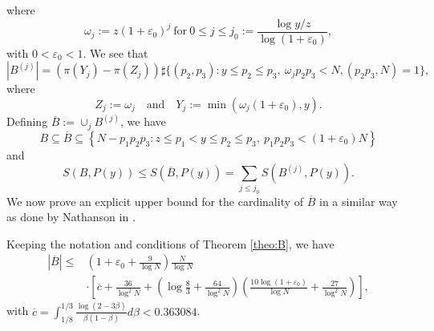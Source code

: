 \documentclass[12pt]{amsart}
\begin{document}
where
\begin{equation}\label{j0eq}
\omega_j:=z(1+\varepsilon_0)^j~\text{for}~0 \le j \le j_0:=\frac{\log y/z}{\log(1+\varepsilon_0)},
\end{equation}
with $0<\varepsilon_0<1$. We see that 
\begin{equation*}
\left|B^{(j)}\right|=(\pi(Y_j)-\pi(Z_j))\sharp \{(p_2,p_3):y\le p_2\le p_3, ~\omega_jp_2p_3<N,(p_2p_3,N)=1\},
\end{equation*}
where 
\begin{equation}\label{zjyj}
    Z_j:=\omega_j\quad\text{and}\quad Y_j:=\min\left(\omega_j(1+\varepsilon_0),y\right).
\end{equation}
Defining  $\overline{B}:=\cup_jB^{(j)}$, we have
\begin{equation}
\label{eq:Bin}
B \subseteq \overline{B}\subseteq \left\{ N-p_1p_2p_3:z \le p_1<y \le p_2 \le p_3,~p_1p_2p_3 <(1+\varepsilon_0)N  \right\}
\end{equation}
and
\begin{equation}
\label{eq:numb}
S(B,P(y))\le S(\overline{B},P(y))= \sum_{j\le j_0}S(B^{(j)},P(y)).
\end{equation}
We now prove an explicit upper bound for the cardinality of $\overline{B}$ in a similar way as done by Nathanson in \cite[pp. 289--291]{Nathanson}.
\begin{lemma}
\label{lemma:Bover}
Keeping the notation and conditions of Theorem \ref{theo:B}, we have
\begin{align*} 
\left| \overline{B}\right| \le & \left(1+\varepsilon_0+\frac{9}{\log N}\right)\frac{N}{\log N}
\\ &\cdot \left[\overline{c} +\frac{36}{\log^2 N} +\left(\log \frac{8}{3} +\frac{64}{\log^2 N} \right)\left( \frac{10\log (1+\varepsilon_0)}{\log N}+ \frac{27}{\log^2 N}\right)\right],
\end{align*}
with $\overline{c}=\int_{1/8}^{1/3} \frac{\log(2-3\beta)}{\beta (1-\beta)}d \beta <0.363084$.
\end{lemma}
\end{document}
